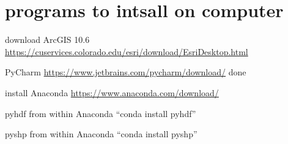 \section{programs to intsall on computer}

download ArcGIS 10.6 \url{https://cuservices.colorado.edu/esri/download/EsriDesktop.html}

PyCharm \url{https://www.jetbrains.com/pycharm/download/} done

install Anaconda \url{https://www.anaconda.com/download/}

pyhdf from within Anaconda ``conda install pyhdf''

pyshp from within Anaconda ``conda install pyshp''

